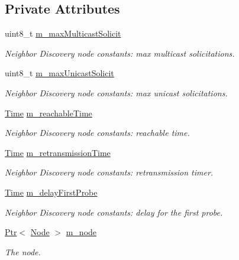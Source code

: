 \subsection*{Private Attributes}
\begin{DoxyCompactItemize}
\item 
uint8\+\_\+t \hyperlink{classns3_1_1Icmpv6L4Protocol_a10486bb2cca386e400fa833e19f93502}{m\+\_\+max\+Multicast\+Solicit}
\begin{DoxyCompactList}\small\item\em Neighbor Discovery node constants\+: max multicast solicitations. \end{DoxyCompactList}\item 
uint8\+\_\+t \hyperlink{classns3_1_1Icmpv6L4Protocol_a772aa2162734a24996b92d673127e7eb}{m\+\_\+max\+Unicast\+Solicit}
\begin{DoxyCompactList}\small\item\em Neighbor Discovery node constants\+: max unicast solicitations. \end{DoxyCompactList}\item 
\hyperlink{classns3_1_1Time}{Time} \hyperlink{classns3_1_1Icmpv6L4Protocol_a18fdc8ec4b55d2192edffb949e89f593}{m\+\_\+reachable\+Time}
\begin{DoxyCompactList}\small\item\em Neighbor Discovery node constants\+: reachable time. \end{DoxyCompactList}\item 
\hyperlink{classns3_1_1Time}{Time} \hyperlink{classns3_1_1Icmpv6L4Protocol_ab06c636fc6de4e1deefb8e9e53bd0dd4}{m\+\_\+retransmission\+Time}
\begin{DoxyCompactList}\small\item\em Neighbor Discovery node constants\+: retransmission timer. \end{DoxyCompactList}\item 
\hyperlink{classns3_1_1Time}{Time} \hyperlink{classns3_1_1Icmpv6L4Protocol_acaf08c9a0615db56d8b0a2632abef51a}{m\+\_\+delay\+First\+Probe}
\begin{DoxyCompactList}\small\item\em Neighbor Discovery node constants\+: delay for the first probe. \end{DoxyCompactList}\item 
\hyperlink{classns3_1_1Ptr}{Ptr}$<$ \hyperlink{classns3_1_1Node}{Node} $>$ \hyperlink{classns3_1_1Icmpv6L4Protocol_a8968d1631f94f0b1cc1fd0e71ea0d0fe}{m\+\_\+node}
\begin{DoxyCompactList}\small\item\em The node. \end{DoxyCompactList}\item 

\end{DoxyCompactItemize}
